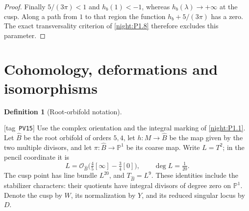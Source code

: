 \documentclass[11pt,a4paper]{article}
\numberwithin{equation}{section}
\theoremstyle{definition}
\newtheorem{definition}[definition]{Definition}
\newcommand{\StatementRecord}[4]{{\upshape\footnotesize[tag~\texttt{#3}]}\enspace\ignorespaces}
\begin{document}
\begin{proof}
Finally $5/(3\pi)<1$ and $h_b(1)<-1$, whereas
$h_b(\lambda)\to+\infty$ at the cusp. Along a path from $1$
to that region the function $h_b+5/(3\pi)$ has a zero.
The exact transversality criterion of \cref{night:P1.8}
therefore excludes this parameter.
\end{proof}


\section{Cohomology, deformations and isomorphisms}\label{pub:V:sec-cohomology}

\begin{definition}[Root-orbifold notation]\hypertarget{tag-PV15}{}\label{def:V:root-orbifold-notation}
\StatementRecord{def:V:root-orbifold-notation}{proved}{PV15}{}
Use the complex orientation and the integral marking of \cref{night:P1.1}.
Let $\widehat B$ be the root orbifold of orders $5,4$, let
$h:M\to\widehat B$ be the map given by the two multiple divisors,
and let $\pi:\widehat B\to\mathbb P^1$ be its coarse map.
Write $L=T^2$; in the pencil coordinate it is
\[
 L=\mathcal O_{\widehat B}\bigl(\tfrac45[\infty]
                  -\tfrac34[0]\bigr),\qquad \deg L=\tfrac1{20}.
\]
The cusp point has line bundle $L^{20}$, and
$T_{\widehat B}=L^9$. These identities include the stabilizer
characters: their quotients have integral divisors of degree zero
on $\mathbb P^1$. Denote the cusp by $W$, its normalization by $Y$,
and its reduced singular locus by $D$.
\end{definition}
\end{document}
